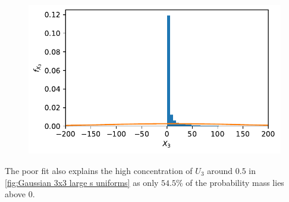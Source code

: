 \documentclass[../Thesis.tex]{subfiles}
\begin{document}
\begin{example}
    \begin{figure}[H]
        \centering
        \includegraphics[width=0.7\linewidth]{figures/ND examples/Gaussian 3x3 large s X3 KDE.pdf}
        \caption{}
        \label{fig:Gaussian 3x3 large s X3 KDE}
    \end{figure}
    The poor fit also explains the high concentration of $U_3$ around $0.5$ in \autoref{fig:Gaussian 3x3 large s uniforms} as only $54.5\%$ of the probability mass lies above $0$.


\end{example}
\end{document}

